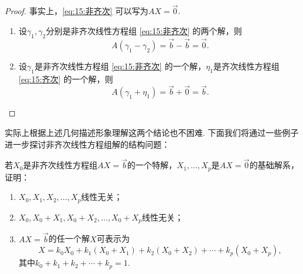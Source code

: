 \begin{proof}
    事实上，\ref*{eq:15:非齐次} 可以写为$AX=\vec{0}$.
    \begin{enumerate}
        \item 设$\gamma_1,\gamma_2$分别是非齐次线性方程组 \ref*{eq:15:非齐次} 的两个解，则
              \[A(\gamma_1-\gamma_2)=\vec{b}-\vec{b}=\vec{0}.\]

        \item 设$\gamma_1$是非齐次线性方程组 \ref*{eq:15:非齐次} 的一个解，$\eta_1$是齐次线性方程组 \ref*{eq:15:齐次} 的一个解，则
              \[A(\gamma_1+\eta_1)=\vec{b}+\vec{0}=\vec{b}.\]
    \end{enumerate}
\end{proof}
实际上根据上述几何描述形象理解这两个结论也不困难. 下面我们将通过一些例子进一步探讨非齐次线性方程组解的结构问题：
\begin{example}\label{ex:15:非齐次解的进一步结构}
    若$X_0$是非齐次线性方程组$AX=\vec{b}$的一个特解，$X_1,\ldots,X_p$是$AX=\vec{0}$的基础解系，证明：
    \begin{enumerate}
        \item $X_0,X_1,X_2,\ldots,X_p$线性无关；

        \item $X_0,X_0+X_1,X_0+X_2,\ldots,X_0+X_p$线性无关；

        \item $AX=\vec{b}$的任一个解$X$可表示为
              \[X=k_0X_0+k_1(X_0+X_1)+k_2(X_0+X_2)+\cdots+k_p(X_0+X_p),\]
              其中$k_0+k_1+k_2+\cdots+k_p=1$.
    \end{enumerate}
\end{example}

